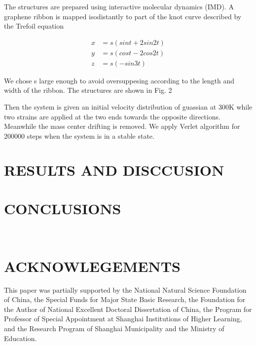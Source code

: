 \documentclass[%
 reprint,
 amsmath,amssymb,
 aps,
prb,
]{revtex4-1}
\begin{document}
The structures are prepared using interactive molecular dynamics (IMD). A graphene ribbon is mapped isodistantly to part of the knot curve described by the Trefoil equation

\begin{equation}
  \begin{aligned}
    x & = s(sin t+2 sin 2t) \\
    y & = s(cos t-2 cos 2t) \\
    z & = s(-sin 3t)
  \end{aligned}
\end{equation}

We chose s large enough to avoid oversuppesing according to the length and width of the ribbon. The structures are shown in Fig. 2

Then the system is given an initial velocity distribution of guassian at 300K while two strains are applied at the two ends towards the opposite directions. Meanwhile the mass center drifting is removed. We apply Verlet algorithm for 200000 steps when the system is in a stable state.

\section{RESULTS AND DISCCUSION}


\section{CONCLUSIONS}


\quad \\
\section{ACKNOWLEGEMENTS}
This paper was partially supported by the National Natural Science Foundation of China, the Special Funds for Major State Basic Research, the Foundation for the Author of National Excellent Doctoral Dissertation of China, the Program for Professor of Special Appointment at Shanghai Institutions of Higher Learning, and the Research Program of Shanghai Municipality and the Ministry of Education.



\end{document}
